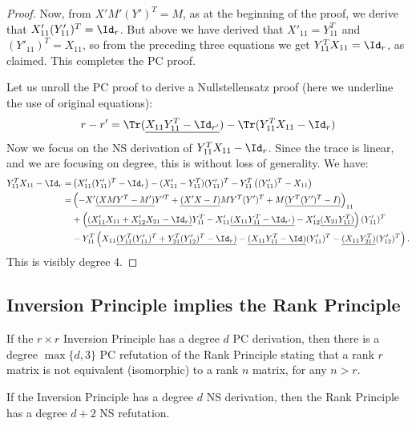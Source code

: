 \begin{proof}
Now, from $X' M' (Y')^T = M$, as at the beginning of the proof, we derive that $X'_{11} (Y'_{11})^T = \Id_r$. But above we have derived that $X'_{11} = Y_{11}^T$ and $(Y'_{11})^T = X_{11}$, so from the preceding three equations we get $Y_{11}^T X_{11} = \Id_r$, as claimed. This completes the PC proof.

Let us unroll the PC proof to derive a Nullstellensatz proof (here we underline the use of original equations):
\begin{align*}
r - r' & = \Tr(\underline{X_{11} Y_{11}^T - \Id_{r'}}) - \Tr(Y_{11}^T X_{11} - \Id_r)  \\
\end{align*}
Now we focus on the NS derivation of $Y_{11}^T X_{11} - \Id_r$. Since the trace is linear, and we are focusing on degree, this is without loss of generality. We have:
\begin{align*}
Y_{11}^T X_{11} - \Id_r = & \left(X'_{11} (Y'_{11})^T - \Id_r\right) - (X'_{11} - Y_{11}^T) (Y'_{11})^T -  Y_{11}^T \left((Y'_{11})^T - X_{11}\right) \\
 = & \left(-X' \underline{(XMY^T - M')} Y'^T + \underline{(X'X - I)}MY^T (Y')^T + M \underline{(Y^T (Y')^T - I)}\right)_{11} \\
  & + \left(\underline{(X'_{11} X_{11} + X'_{12} X_{21} - \Id_r)} Y_{11}^T - X'_{11} \underline{(X_{11} Y_{11}^T - \Id_{r'})} - X'_{12}\underline{(X_{21} Y_{11}^T)} \right) (Y'_{11})^T \\ 
  & -  Y_{11}^T \left( X_{11} \underline{(Y_{11}^T (Y'_{11})^T + Y_{21}^T (Y'_{12})^T - \Id_r)} - \underline{(X_{11} Y_{11}^T - \Id)} (Y'_{11})^T - \underline{(X_{11} Y_{21}^T)} (Y'_{12})^T   \right). 
\end{align*}
This is visibly degree 4.
\end{proof}

\subsection{Inversion Principle implies the Rank Principle}

\begin{lemma} \label{lem:inv_to_rank}
If the $r \times r$ Inversion Principle has a degree $d$ PC derivation, 
then there is a degree $\max\{d,3\}$ PC refutation of the Rank Principle stating that a rank $r$ matrix is not equivalent (isomorphic) to a rank $n$ matrix, for any $n > r$. 

If the Inversion Principle has a degree $d$ NS derivation, then the Rank Principle has a degree $d+2$ NS refutation.
\end{lemma}

